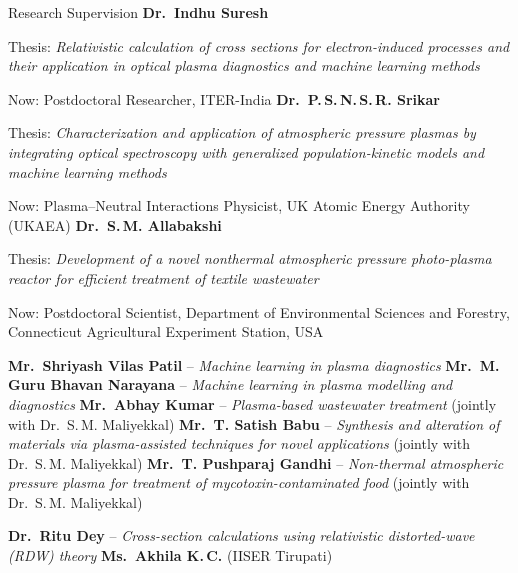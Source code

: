 \begin{rubric}{Research Supervision}
\entry*[2020 -- 2025]%
  \textbf{Dr.\ Indhu Suresh}\par
  Thesis: \emph{Relativistic calculation of cross sections for electron-induced processes and their application in optical plasma diagnostics and machine learning methods}\par
  Now: Postdoctoral Researcher, ITER-India
\entry*[2019 -- 2025]%
  \textbf{Dr.\ P.\,S.\,N.\,S.\,R. Srikar}\par
  Thesis: \emph{Characterization and application of atmospheric pressure plasmas by integrating optical spectroscopy with generalized population-kinetic models and machine learning methods}\par
  Now: Plasma--Neutral Interactions Physicist, UK Atomic Energy Authority (UKAEA)
\entry*[2019 -- 2024]%
  \textbf{Dr.\ S.\,M. Allabakshi}\par
  Thesis: \emph{Development of a novel nonthermal atmospheric pressure photo-plasma reactor for efficient treatment of textile wastewater}\par
  Now: Postdoctoral Scientist, Department of Environmental Sciences and Forestry, Connecticut Agricultural Experiment Station, USA

\entry*[2024 -- present]%
  \textbf{Mr.\ Shriyash Vilas Patil} -- \emph{Machine learning in plasma diagnostics}
\entry*[2024 -- present]%
  \textbf{Mr.\ M. Guru Bhavan Narayana} -- \emph{Machine learning in plasma modelling and diagnostics}
\entry*[2024 -- present]%
  \textbf{Mr.\ Abhay Kumar} -- \emph{Plasma-based wastewater treatment} {\small(jointly with Dr.\ S.\,M. Maliyekkal)}
\entry*[2022 -- present]%
  \textbf{Mr.\ T. Satish Babu} -- \emph{Synthesis and alteration of materials via plasma-assisted techniques for novel applications} {\small(jointly with Dr.\ S.\,M. Maliyekkal)}
\entry*[2022 -- present]%
  \textbf{Mr.\ T. Pushparaj Gandhi} -- \emph{Non-thermal atmospheric pressure plasma for treatment of mycotoxin-contaminated food} {\small(jointly with Dr.\ S.\,M. Maliyekkal)}

\entry*[Postdoc]%
  \textbf{Dr.\ Ritu Dey} -- \emph{Cross-section calculations using relativistic distorted-wave (RDW) theory}
\entry*[M.S.]%
  \textbf{Ms.\ Akhila K.\,C.} (IISER Tirupati)


\end{rubric}
